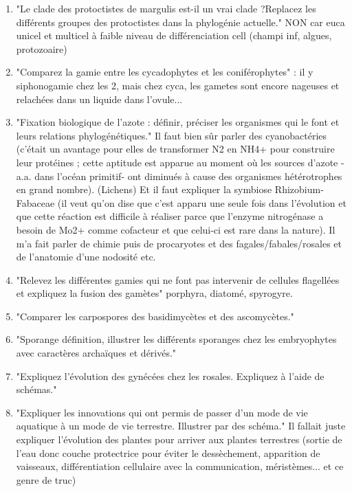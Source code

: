 \begin{enumerate}
	\item "Le clade des protoctistes de margulis est-il un vrai clade ?Replacez les différents groupes des protoctistes dans la phylogénie actuelle." NON car euca unicel et multicel à faible niveau de différenciation cell (champi inf, algues, protozoaire)

	\item "Comparez la gamie entre les cycadophytes et les coniférophytes" : il y siphonogamie chez les 2, mais chez cyca, les gametes sont encore nageuses et relachées dans un liquide dans l'ovule...

	\item "Fixation biologique de l'azote : définir, préciser les organismes qui le font et leurs relations phylogénétiques." Il faut bien sûr parler des cyanobactéries (c'était un avantage pour elles de transformer N2 en NH4+ pour construire leur protéines ; cette aptitude est apparue au moment où les sources d'azote -a.a. dans l'océan primitif- ont diminués à cause des organismes hétérotrophes en grand nombre). (Lichens) Et il faut expliquer la symbiose Rhizobium-Fabaceae (il veut qu'on dise que c'est apparu une seule fois dans l'évolution et que cette réaction est difficile à réaliser parce que l'enzyme nitrogénase a besoin de Mo2+ comme cofacteur et que celui-ci est rare dans la nature). Il m'a fait parler de chimie puis de procaryotes et des fagales/fabales/rosales et de l'anatomie d'une nodosité etc.

	\item "Relevez les différentes gamies qui ne font pas intervenir de cellules flagellées et expliquez la fusion des gamètes"  porphyra, diatomé, spyrogyre.

	\item "Comparer les carpospores des basidimycètes et des ascomycètes."

	\item "Sporange définition, illustrer les différents sporanges chez les embryophytes avec caractères archaïques et dérivés."

	\item "Expliquez l'évolution des gynécées chez les rosales. Expliquez à l'aide de schémas."
	
	\item "Expliquer les innovations qui ont permis de passer d'un mode de vie aquatique à un mode de vie terrestre. Illustrer par des schéma." Il fallait juste expliquer l'évolution des plantes pour arriver aux plantes terrestres (sortie de l’eau donc couche protectrice pour éviter le dessèchement, apparition  de vaisseaux, différentiation cellulaire avec la communication, méristèmes... et ce genre de truc)


\end{enumerate}
